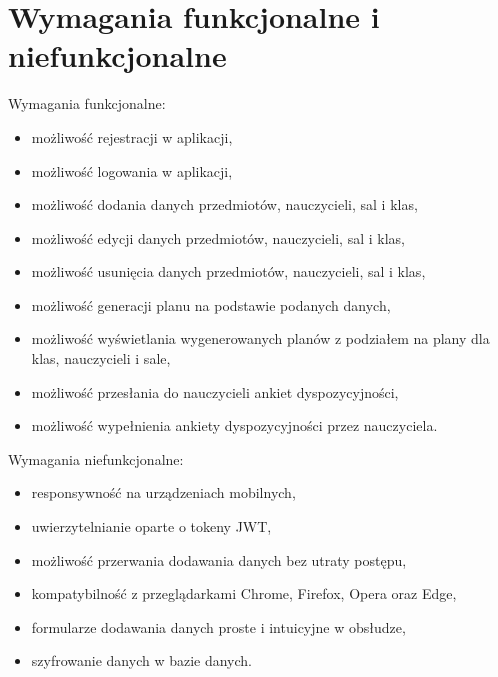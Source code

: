 \section{Wymagania funkcjonalne i niefunkcjonalne}
Wymagania funkcjonalne:
\begin{itemize}
    \item możliwość rejestracji w aplikacji,
    \item możliwość logowania w aplikacji,
    \item możliwość dodania danych przedmiotów, nauczycieli, sal i klas,
    \item możliwość edycji danych przedmiotów, nauczycieli, sal i klas,
    \item możliwość usunięcia danych przedmiotów, nauczycieli, sal i klas,
    \item możliwość generacji planu na podstawie podanych danych,
     \item możliwość wyświetlania wygenerowanych planów z podziałem na plany dla klas, nauczycieli i sale,
    \item możliwość przesłania do nauczycieli ankiet dyspozycyjności,
    \item możliwość wypełnienia ankiety dyspozycyjności przez nauczyciela.
\end{itemize}
Wymagania niefunkcjonalne:
\begin{itemize}
    \item responsywność na urządzeniach mobilnych,
    \item uwierzytelnianie oparte o tokeny JWT,
    \item możliwość przerwania dodawania danych bez utraty postępu,
    \item kompatybilność z przeglądarkami Chrome, Firefox, Opera oraz Edge,
    \item formularze dodawania danych proste i intuicyjne w obsłudze,
    \item szyfrowanie danych w bazie danych.
\end{itemize}

